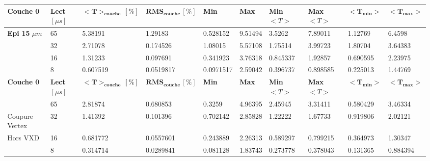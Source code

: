 \begin{table}
\small
\centering
\begin{tabular}{|l|l|l|l|l|l|l|l|l|l|}
\hline
\textbf{Couche 0} & \textbf{Lect} $[\mu s]$ & $\mathbf{<T>_{couche} \, [\%]}$ & $\mathbf{RMS_{couche} \, [\%]}$ & \textbf{Min} & \textbf{Max} & \textbf{Min} $<T>$ & \textbf{Max} $<T>$ & $\mathbf{<T_{min}>}$ & $\mathbf{<T_{max}>}$ \\ \hline
 \textbf{Epi 15} $\mu m$              & 65            & 5.38191                  & 1.29183                 & 0.528152  & 9.51494   & 3.5262        & 7.89011       & 1.12769         & 6.4598          \\ \hline
                              & 32            & 2.71078                  & 0.174526                & 1.08015   & 5.57108   & 1.75514       & 3.99723       & 1.80704         & 3.64383         \\ \hline
                              & 16            & 1.31233                  & 0.097691                & 0.341923  & 3.76318   & 0.845337      & 1.92857       & 0.690595        & 2.23975         \\ \hline
                              & 8             & 0.607519                 & 0.0519817               & 0.0971517 & 2.59042   & 0.396737      & 0.898585      & 0.225013        & 1.44769         \\ \hline
\textbf{Couche 0}             & \textbf{Lect} $[\mu s]$ & $\mathbf{<T>_{couche} \, [\%]}$ & $\mathbf{RMS_{couche} \, [\%]}$ & \textbf{Min} & \textbf{Max} & \textbf{Min} $<T>$ & \textbf{Max} $<T>$ & $\mathbf{<T_{min}>}$ & $\mathbf{<T_{max}>}$ \\ \hline
                              & 65            & 2.81874                  & 0.680853                & 0.3259    & 4.96395   & 2.45945       & 3.31411       & 0.580429        & 3.46334         \\ \hline
Coupure Vertex                & 32            & 1.41392                  & 0.101396                & 0.702142  & 2.85828   & 1.22222       & 1.67733       & 0.919806        & 2.02121         \\ \hline
Hors VXD                      & 16            & 0.681772                 & 0.0557601               & 0.243889  & 2.26313   & 0.589297      & 0.799215      & 0.364973        & 1.30347         \\ \hline
                              & 8             & 0.314714                 & 0.0289841               & 0.081128  & 1.83743   & 0.273778      & 0.378043      & 0.131365        & 0.884394        \\ \hline

\end{tabular}
\end{table}
